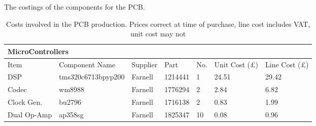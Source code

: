 The costings of the components for the PCB.

\begin{table}[H]
	\centering
	\begin{tabular}[c]{| l | l | l | l | l | l | l |}
		\hline
		\multicolumn{7}{|l|}{MicroControllers} \\
		\hline
		Item	& Component Name& Supplier & Part	& No.	& Unit Cost (\pounds)  & Line Cost (\pounds) \\
		\hline
		DSP	& tms320c6713bpyp200	& Farnell	& 1214441	& 1	& 24.51	& 29.42	\\
		Codec	& wm8988		& Farnell	& 1776294	& 2	& 2.84	& 6.82	\\
		Clock Gen.	& bu2796	& Farnell	& 1716138	& 2	& 0.83	& 1.99	\\
		Dual Op-Amp	& ap358sg	& Farnell	& 1825347	& 10	& 0.08	& 0.96	\\
		\hline
	\end{tabular}
	\caption{Costs involved in the PCB production. Prices correct at time of purchase, line cost includes VAT, unit cost may not}
	\label{tab:pcbcostings}
\end{table}
